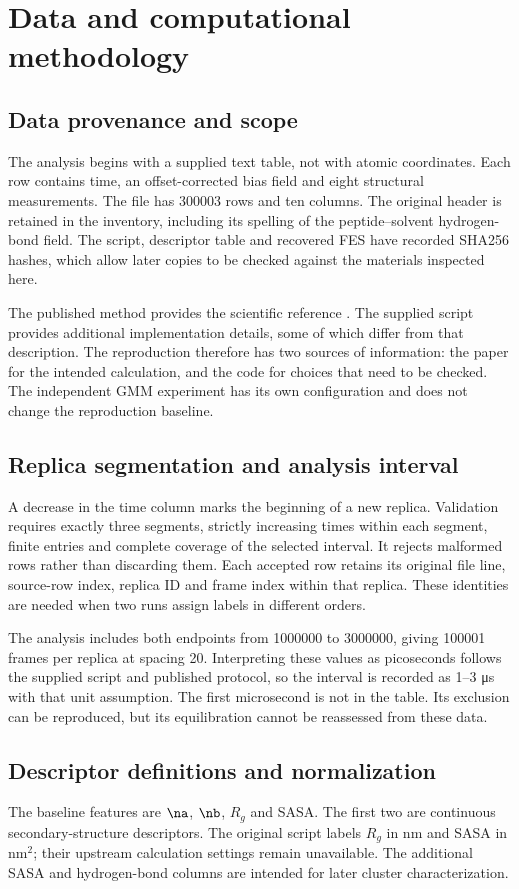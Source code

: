 \chapter{Data and computational methodology}
\section{Data provenance and scope}
The analysis begins with a supplied text table, not with atomic coordinates. Each row contains time, an offset-corrected bias field and eight structural measurements. The file has \num{300003} rows and ten columns. The original header is retained in the inventory, including its spelling of the peptide--solvent hydrogen-bond field. The script, descriptor table and recovered FES have recorded SHA256 hashes, which allow later copies to be checked against the materials inspected here.

The published method provides the scientific reference \autocite{cadenelli2026}. The supplied script provides additional implementation details, some of which differ from that description. The reproduction therefore has two sources of information: the paper for the intended calculation, and the code for choices that need to be checked. The independent GMM experiment has its own configuration and does not change the reproduction baseline.

\section{Replica segmentation and analysis interval}
A decrease in the time column marks the beginning of a new replica. Validation requires exactly three segments, strictly increasing times within each segment, finite entries and complete coverage of the selected interval. It rejects malformed rows rather than discarding them. Each accepted row retains its original file line, source-row index, replica ID and frame index within that replica. These identities are needed when two runs assign labels in different orders.

The analysis includes both endpoints from \num{1000000} to \num{3000000}, giving \num{100001} frames per replica at spacing 20. Interpreting these values as picoseconds follows the supplied script and published protocol, so the interval is recorded as 1--3 μs with that unit assumption. The first microsecond is not in the table. Its exclusion can be reproduced, but its equilibration cannot be reassessed from these data.

\section{Descriptor definitions and normalization}
The baseline features are $\na$, $\nb$, $R_g$ and SASA. The first two are continuous secondary-structure descriptors. The original script labels $R_g$ in nm and SASA in nm$^2$; their upstream calculation settings remain unavailable. The additional SASA and hydrogen-bond columns are intended for later cluster characterization.

